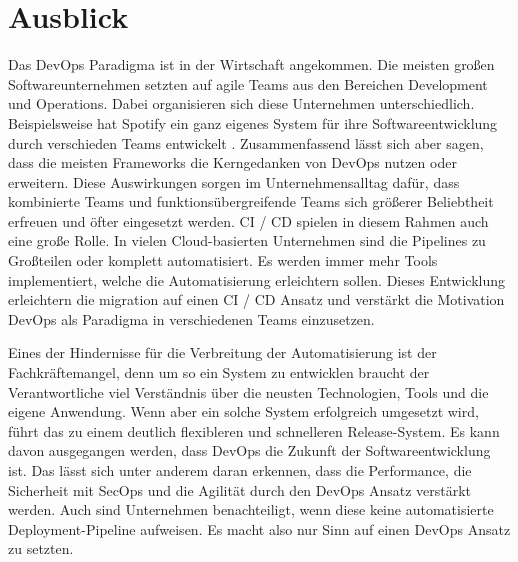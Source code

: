 \chapter{Ausblick}
\label{cha:conclusion}

Das DevOps Paradigma ist in der Wirtschaft angekommen. Die meisten großen Softwareunternehmen setzten auf agile Teams aus den Bereichen Development und Operations. Dabei organisieren sich diese Unternehmen unterschiedlich. Beispielsweise hat Spotify ein ganz eigenes System für ihre Softwareentwicklung durch verschieden Teams entwickelt \cite{spotify}. Zusammenfassend lässt sich aber sagen, dass die meisten Frameworks die Kerngedanken von DevOps nutzen oder erweitern. Diese Auswirkungen sorgen im Unternehmensalltag dafür, dass kombinierte Teams und funktionsübergreifende Teams sich größerer Beliebtheit erfreuen und öfter eingesetzt werden. CI / CD spielen in diesem Rahmen auch eine große Rolle. In vielen Cloud-basierten Unternehmen sind die Pipelines zu Großteilen oder komplett automatisiert. Es werden immer mehr Tools implementiert, welche die Automatisierung erleichtern sollen. Dieses Entwicklung erleichtern die migration auf einen CI / CD Ansatz und verstärkt die Motivation DevOps als Paradigma in verschiedenen Teams einzusetzen. 

Eines der Hindernisse für die Verbreitung der Automatisierung ist der Fachkräftemangel, denn um so ein System zu entwicklen braucht der Verantwortliche viel Verständnis über die neusten Technologien, Tools und die eigene Anwendung. Wenn aber ein solche System erfolgreich umgesetzt wird, führt das zu einem deutlich flexibleren und schnelleren Release-System. Es kann davon ausgegangen werden, dass DevOps die Zukunft der Softwareentwicklung ist. Das lässt sich unter anderem daran erkennen, dass die Performance, die Sicherheit mit SecOps und die Agilität durch den DevOps Ansatz verstärkt werden. Auch sind Unternehmen benachteiligt, wenn diese keine automatisierte Deployment-Pipeline aufweisen. Es macht also nur Sinn auf einen DevOps Ansatz zu setzten.